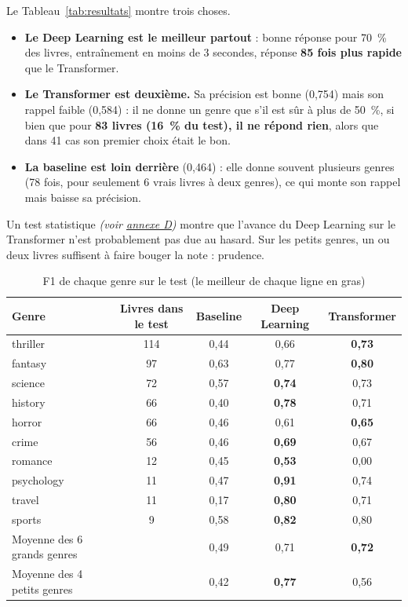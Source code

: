 \documentclass[11pt,a4paper]{article}
\newcommand{\voir}[2]{{\small\textit{(voir \hyperref[#1]{#2})}}}
\begin{document}
Le Tableau~\ref{tab:resultats} montre trois choses.
\begin{itemize}
    \item \textbf{Le Deep Learning est le meilleur partout} : bonne réponse pour 70~\% des livres, entraînement en moins de 3 secondes, réponse \textbf{85 fois plus rapide} que le Transformer.
    \item \textbf{Le Transformer est deuxième.} Sa précision est bonne (0,754) mais son rappel faible (0,584) : il ne donne un genre que s'il est sûr à plus de 50~\%, si bien que pour \textbf{83 livres (16~\% du test), il ne répond rien}, alors que dans 41 cas son premier choix était le bon.
    \item \textbf{La baseline est loin derrière} (0,464) : elle donne souvent plusieurs genres (78 fois, pour seulement 6 vrais livres à deux genres), ce qui monte son rappel mais baisse sa précision.
\end{itemize}
Un test statistique \voir{annexe:stats}{annexe D} montre que l'avance du Deep Learning sur le Transformer n'est probablement pas due au hasard. Sur les petits genres, un ou deux livres suffisent à faire bouger la note : prudence.

\begin{table}[htbp]
\centering
\caption{F1 de chaque genre sur le test (le meilleur de chaque ligne en gras)}
\label{tab:genres-f1}
\small
\begin{tabular}{l c c c c}
\toprule
\textbf{Genre} & \textbf{Livres dans le test} & \textbf{Baseline} & \textbf{Deep Learning} & \textbf{Transformer} \\
\midrule
thriller   & 114 & 0,44 & 0,66 & \textbf{0,73} \\
fantasy    & 97  & 0,63 & 0,77 & \textbf{0,80} \\
science    & 72  & 0,57 & \textbf{0,74} & 0,73 \\
history    & 66  & 0,40 & \textbf{0,78} & 0,71 \\
horror     & 66  & 0,46 & 0,61 & \textbf{0,65} \\
crime      & 56  & 0,46 & \textbf{0,69} & 0,67 \\
romance    & 12  & 0,45 & \textbf{0,53} & 0,00 \\
psychology & 11  & 0,47 & \textbf{0,91} & 0,74 \\
travel     & 11  & 0,17 & \textbf{0,80} & 0,71 \\
sports     & 9   & 0,58 & \textbf{0,82} & 0,80 \\
\midrule
Moyenne des 6 grands genres & & 0,49 & 0,71 & \textbf{0,72} \\
Moyenne des 4 petits genres & & 0,42 & \textbf{0,77} & 0,56 \\
\bottomrule
\end{tabular}
\end{table}
\end{document}
